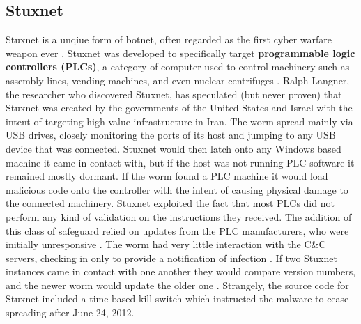 \subsection{Stuxnet}
Stuxnet is a unqiue form of botnet, often regarded as the first cyber
warfare weapon ever \cite{stuxnet}. Stuxnet
was developed to specifically target \textbf{programmable logic controllers (PLCs)},
a category of computer used to control machinery such as assembly lines,
vending machines, and even nuclear centrifuges \cite{stuxnet}.  Ralph Langner,
the researcher who discovered Stuxnet, has speculated (but never proven)
that Stuxnet was created by the governments of the United States and Israel with the intent of
targeting high-value infrastructure in Iran. The worm spread mainly via USB drives,
closely monitoring the ports of its host and jumping to any USB device that was connected.
Stuxnet would then latch onto any Windows based machine it came in
contact with, but if the host was not running PLC software it remained mostly dormant.
If the worm found a PLC machine it would load malicious code onto the controller
with the intent of causing physical damage to the connected machinery. Stuxnet exploited the fact that most
PLCs did not perform any kind of validation on the instructions they received.
The addition of this class of safeguard relied on updates from the PLC manufacturers, who were
initially unresponsive \cite{stuxnet}.
The worm had very little interaction with the C\&C servers, checking in only
to provide a notification of infection \cite{stuxnet}.  If two Stuxnet instances
came in contact with one another they would compare version numbers, and
the newer worm would update the older one \cite{stuxnet}. Strangely, the source
code for Stuxnet included a time-based kill switch which instructed the malware
to cease spreading after June 24, 2012.

